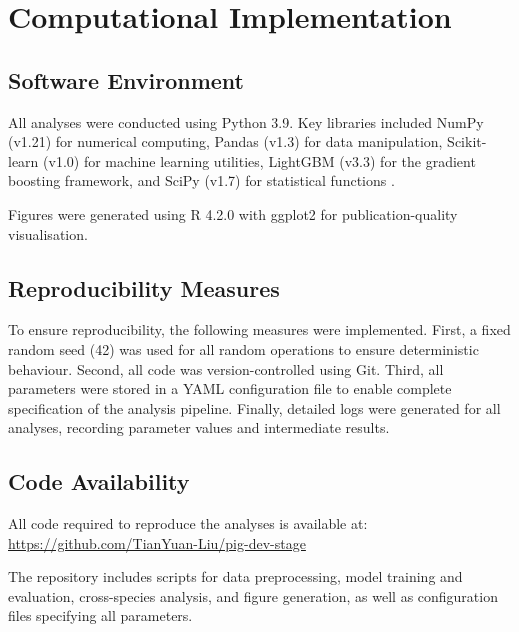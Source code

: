 \section{Computational Implementation}\label{sec:methods:implementation}

\subsection{Software Environment}

All analyses were conducted using Python 3.9. Key libraries included NumPy (v1.21) for numerical computing, Pandas (v1.3) for data manipulation, Scikit-learn (v1.0) for machine learning utilities, LightGBM (v3.3) for the gradient boosting framework, and SciPy (v1.7) for statistical functions \parencite{pedregosa_scikit-learn_nodate, harris_array_2020, virtanen_scipy_2020, ke_lightgbm_2017, mckinney_data_2010}.

Figures were generated using R 4.2.0 with ggplot2 for publication-quality visualisation.
\subsection{Reproducibility Measures}

To ensure reproducibility, the following measures were implemented. First, a fixed random seed (42) was used for all random operations to ensure deterministic behaviour. Second, all code was version-controlled using Git. Third, all parameters were stored in a YAML configuration file to enable complete specification of the analysis pipeline. Finally, detailed logs were generated for all analyses, recording parameter values and intermediate results.

\subsection{Code Availability}

All code required to reproduce the analyses is available at: \url{https://github.com/TianYuan-Liu/pig-dev-stage}

The repository includes scripts for data preprocessing, model training and evaluation, cross-species analysis, and figure generation, as well as configuration files specifying all parameters.
